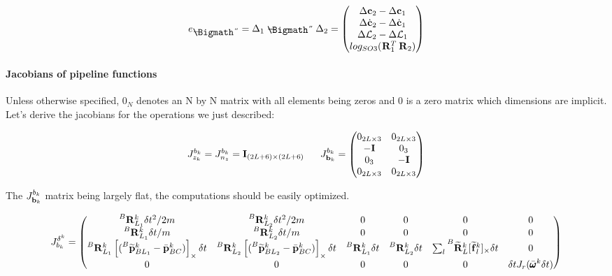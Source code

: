 \documentclass[11pt]{article}
\newcommand{\Rot}[2]{\prescript{#1}{}{\bfR}_{#2}}
\newcommand{\Rotm}[2]{\prescript{#1}{}{\widetilde{\bfR}}_{#2}}
\newcommand{\bias}{\bfb}
\newcommand{\posim}[2]{\prescript{#1}{}{\widetilde{\bfp}}_{#2}}
\newcommand{\posibar}{\bar{\bfp}}
\newcommand{\angvelbar}{\bar{\pmb{\omega}}}
\newcommand{\forcem}[2]{\prescript{#1}{}{\widetilde{\bff}}_{#2}}
\newcommand{\AM}{\mathcal{L}}
\newcommand{\COM}{\bfc}
\newcommand{\COMd}{\dot{\bfc}}
\newcommand{\Ident}{\bfI}
\def\diamondminus{\mathrel{%
		\ooalign{$-$\cr\hss\lower.255ex\hbox{\Bigmath\char5}\hss}}}
\begin{document}
\begin{equation}
	e_{\diamondminus} = \Delta_1 \diamondminus \Delta_2 =
	\begin{pmatrix}
	\Delta \COM_2 - \Delta \COM_1
	\\
	\Delta \COMd_2 - \Delta \COMd_1
	\\
	\Delta \AM_2 - \Delta \AM_1
	\\
	log_{SO3}(\Rot{}{1}^T \Rot{}{2})
	\end{pmatrix}
\end{equation}







\paragraph{Jacobians of pipeline functions}
Unless otherwise specified, $0_N$ denotes an N by N matrix with all elements being zeros and $0$ is a zero matrix which dimensions are implicit.
Let's derive the jacobians for the operations we just described:

\begin{equation}
    J^{b_k}_{z_k} = J^{b_k}_{n_z} = \Ident_{(2L+6)\times (2L+6)}
    ~~~~~
    J^{b_k}_{\bias_k} =
    \begin{pmatrix}
    0_{2L\times 3} & 0_{2L\times 3}
    \\
    -\Ident & 0_3
    \\
    0_3 & -\Ident
	\\
	0_{2L\times 3} & 0_{2L\times 3}
    \end{pmatrix}
\end{equation}

The $J^{b_k}_{\bias_k}$ matrix being largely flat, the computations should be easily optimized.

\begin{equation}
J^{\delta ^k}_{b_k} =
\begin{pmatrix}
    \Rot{B}{L_1}^k \delta t^2/2m & \Rot{B}{L_2}^k \delta t^2/2m & 0 & 0 & 0 & 0 
    \\
    \Rot{B}{L_1}^k \delta t/m & \Rot{B}{L_2}^k \delta t/m & 0 & 0 & 0 & 0  
    \\
    \Rot{B}{L_1}^k\left[(\posim{B}{BL_1}^k - \posibar_{BC}^k) \right]_{\times} \delta t & \Rot{B}{L_2}^k\left[(\posim{B}{BL_2}^k - \posibar_{BC}^k) \right]_{\times} \delta t & \Rot{B}{L_1}^k \delta t &  \Rot{B}{L_2}^k \delta t & \sum_{l} \Rotm{B}{L}^k [\forcem{}{l}^k]_{\times} \delta t & 0 
    \\
    0 & 0 & 0 & 0 & 0 & \delta t J_r (\angvelbar^k \delta t)
\end{pmatrix}
\end{equation}
\end{document}
